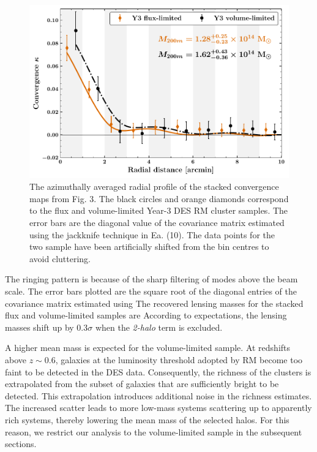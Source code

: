 \begin{figure}[ht]
\includegraphics[width=\linewidth]{figs/kappa_model_MF_y3_v6_4_22_full_vl_radprf_JODY.pdf}
\caption{The azimuthally averaged radial profile of the stacked convergence maps from Fig. 3. The black circles and orange diamonds correspond to the flux and volume-limited Year-3 DES RM cluster samples. The error bars are the diagonal value of the covariance matrix estimated using the jackknife technique in Ea. (10). The data points for the two sample have been artificially shifted from the bin centres to avoid cluttering. }
\label{fig:fig_QE_stacked_maps}
\end{figure}

The ringing pattern is because of the sharp filtering of modes above the \sptpol{} beam scale. 
The error bars plotted are the square root of the diagonal entries of the covariance matrix estimated using %
The recovered lensing masses for the stacked flux and volume-limited samples are %
According to expectations, the lensing masses shift up by 0.3$\sigma$ when the {\it 2-halo} term is excluded.


A higher mean mass is expected for the volume-limited sample. 
At redshifts above $z\sim 0.6$, galaxies at the luminosity threshold adopted by RM become too faint to be detected in the DES data. 
Consequently, the richness of the clusters is extrapolated from the subset of galaxies that are sufficiently bright to be detected. 
This extrapolation introduces additional noise in the richness estimates.
The increased scatter leads to more low-mass systems scattering up to apparently rich systems, thereby lowering the mean mass of the selected halos. 
For this reason, we restrict our analysis to the volume-limited sample in the subsequent sections. 
